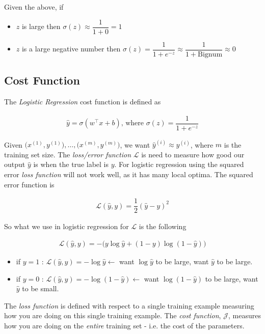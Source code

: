 \documentclass[12pt,reqno]{book}      %
\begin{document}
Given the above, if
\begin{itemize}
	\item $z$ is large then $\sigma(z) \approx \dfrac{1}{1 + 0} = 1$
    \item $z$ is a large negative number then $\sigma(z) = \dfrac{1}{1 + e^{-z}} \approx \dfrac{1}{1 + \text{Bignum}} \approx 0$
\end{itemize}


\subsection{Cost Function}
The \textit{Logistic Regression} cost function is defined as 

\begin{align}
\hat{y} = \sigma(w^\intercal x + b) \text{, where } \sigma(z) = \dfrac{1}{1 + e^{-z}}
\end{align}


Given $\big( x^{(1)}, y^{(1)} \big),\dots{} , \big( x^{(m)}, y^{(m)} \big)$, we want $\hat{y}^{(i)} \approx y^{(i)}$, where $m$ is the training set size. The \textit{loss/error function} $\mathscr{L}$ is need to measure how good our output $\hat{y}$ is when the true label is $y$.  For logistic regression using the squared error  \textit{loss function} will not work well, as it has many local optima. The squared error function is 

\begin{align}
\mathscr{L}(\hat{y}, y) = \dfrac{1}{2} (\hat{y} - y)^{2}
\end{align}

So what we use in logistic regression for $\mathscr{L}$ is the following

\begin{align}
\mathscr{L}(\hat{y}, y) = - \big( y \log \hat{y} + (1 - y) \log  (1 - \hat{y}) \big)
\end{align}

\begin{itemize}
	\item if $y = 1$ : $\mathscr{L}(\hat{y}, y) = - \log \hat{y} \leftarrow$ want $\log \hat{y}$ to be large, want $\hat{y}$ to be large.
	\item if $ y= 0$ : $\mathscr{L}(\hat{y}, y) = - \log (1 - \hat{y}) \leftarrow$ want $\log (1 - \hat{y})$ to be large, want $\hat{y}$ to be small.
\end{itemize}

The \textit{loss function} is defined with respect to a single training example measuring how you are doing on this single training example. The \textit{cost function}, $\mathscr{J}$, measures how you are doing on the \textit{entire} training set - i.e. the cost of the parameters. 
\end{document}
